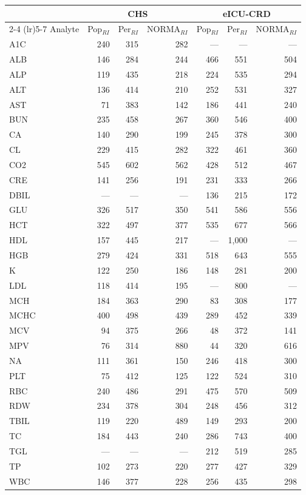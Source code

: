 \begin{table}[ht]
\centering
\footnotesize
\begin{tabular}{lrrrrrr}
\toprule
 & \multicolumn{3}{c}{CHS} & \multicolumn{3}{c}{eICU-CRD} \\
\cmidrule(lr){2-4} \cmidrule(lr){5-7}
Analyte & Pop$_{RI}$ & Per$_{RI}$ & NORMA$_{RI}$ & Pop$_{RI}$ & Per$_{RI}$ & NORMA$_{RI}$ \\
\midrule
A1C & 240 & 315 & 282 & --- & --- & --- \\
ALB & 146 & 284 & 244 & 466 & 551 & 504 \\
ALP & 119 & 435 & 218 & 224 & 535 & 294 \\
ALT & 136 & 414 & 210 & 252 & 531 & 327 \\
AST & 71 & 383 & 142 & 186 & 441 & 240 \\
BUN & 235 & 458 & 267 & 360 & 546 & 400 \\
CA & 140 & 290 & 199 & 245 & 378 & 300 \\
CL & 229 & 415 & 282 & 322 & 461 & 360 \\
CO2 & 545 & 602 & 562 & 428 & 512 & 467 \\
CRE & 141 & 256 & 191 & 231 & 333 & 266 \\
DBIL & --- & --- & --- & 136 & 215 & 172 \\
GLU & 326 & 517 & 350 & 541 & 586 & 556 \\
HCT & 322 & 497 & 377 & 535 & 677 & 566 \\
HDL & 157 & 445 & 217 & --- & 1,000 & --- \\
HGB & 279 & 424 & 331 & 518 & 643 & 555 \\
K & 122 & 250 & 186 & 148 & 281 & 200 \\
LDL & 118 & 414 & 195 & --- & 800 & --- \\
MCH & 184 & 363 & 290 & 83 & 308 & 177 \\
MCHC & 400 & 498 & 439 & 289 & 452 & 339 \\
MCV & 94 & 375 & 266 & 48 & 372 & 141 \\
MPV & 76 & 314 & 880 & 44 & 320 & 616 \\
NA & 111 & 361 & 150 & 246 & 418 & 300 \\
PLT & 75 & 412 & 125 & 122 & 524 & 310 \\
RBC & 240 & 486 & 291 & 475 & 570 & 509 \\
RDW & 234 & 378 & 304 & 248 & 456 & 312 \\
TBIL & 119 & 220 & 489 & 149 & 293 & 200 \\
TC & 184 & 443 & 240 & 286 & 743 & 400 \\
TGL & --- & --- & --- & 212 & 519 & 285 \\
TP & 102 & 273 & 220 & 277 & 427 & 329 \\
WBC & 146 & 377 & 228 & 256 & 435 & 298 \\
\bottomrule
\end{tabular}
\label{tab:prevalence_interpret}
\end{table}
